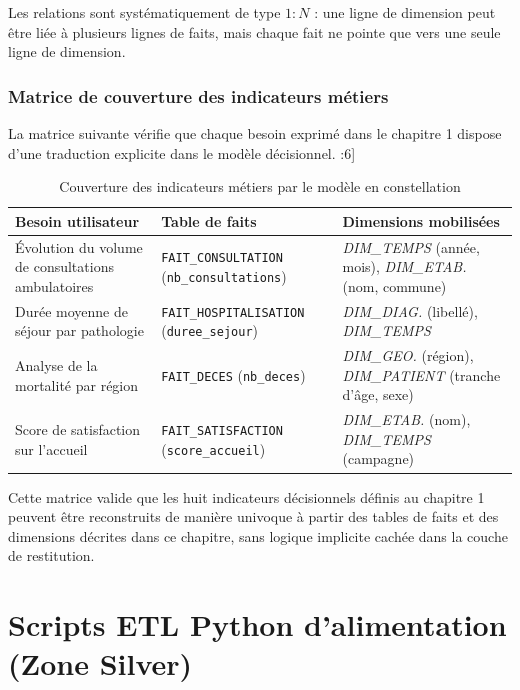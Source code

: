 \documentclass[12pt, a4paper]{report}
\newcommand{\code}[1]{\texttt{#1}}
\newcommand{\dimtps}{{\small\textit{DIM\_TEMPS}}}
\newcommand{\dimeta}{{\small\textit{DIM\_ETAB.}}}
\newcommand{\diag}{{\small\textit{DIM\_DIAG.}}}
\newcommand{\dimgeo}{{\small\textit{DIM\_GEO.}}}
\newcommand{\dimpat}{{\small\textit{DIM\_PATIENT}}}
\begin{document}
\begin{itemize}[label=\textcolor{chuBlue}{\textbullet}]
Les relations sont systématiquement de type \(1:N\) : une ligne de dimension peut être liée à plusieurs lignes de faits, mais chaque fait ne pointe que vers une seule ligne de dimension.

\subsection{Matrice de couverture des indicateurs métiers}

La matrice suivante vérifie que chaque besoin exprimé dans le chapitre 1 dispose d’une traduction explicite dans le modèle décisionnel. :6]

\begin{table}[htbp]
\centering
\small
\begin{tabularx}{\linewidth}{L{5cm} L{3.8cm} X}
\toprule
{}
\textbf{Besoin utilisateur} & \textbf{Table de faits} & \textbf{Dimensions mobilisées} \\
\midrule
Évolution du volume de consultations ambulatoires &
\code{FAIT\_CONSULTATION} (\code{nb\_consultations}) &
\dimtps{} (année, mois), \dimeta{} (nom, commune) \\
Durée moyenne de séjour par pathologie &
\code{FAIT\_HOSPITALISATION} (\code{duree\_sejour}) &
\diag{} (libellé), \dimtps{} \\
Analyse de la mortalité par région &
\code{FAIT\_DECES} (\code{nb\_deces}) &
\dimgeo{} (région), \dimpat{} (tranche d’âge, sexe) \\
Score de satisfaction sur l’accueil &
\code{FAIT\_SATISFACTION} (\code{score\_accueil}) &
\dimeta{} (nom), \dimtps{} (campagne) \\
\bottomrule
\end{tabularx}
\caption{Couverture des indicateurs métiers par le modèle en constellation}
\label{tab:couverture_model_gold}
\end{table}

Cette matrice valide que les huit indicateurs décisionnels définis au chapitre 1 peuvent être reconstruits de manière univoque à partir des tables de faits et des dimensions décrites dans ce chapitre, sans logique implicite cachée dans la couche de restitution.



\chapter{Scripts ETL Python d'alimentation (Zone Silver)}


\end{itemize}
\end{document}
